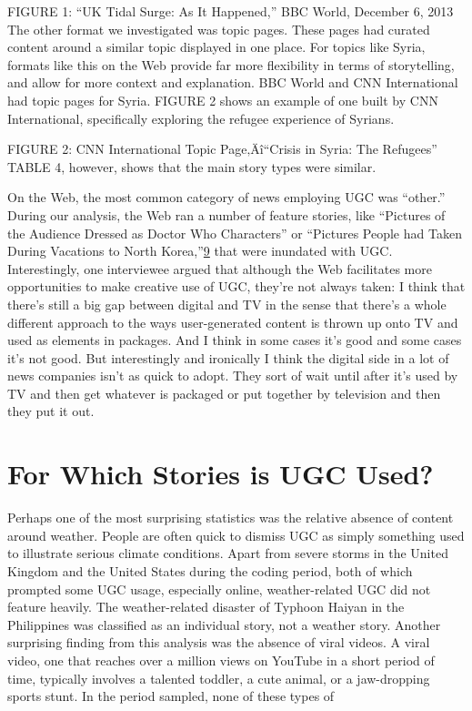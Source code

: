 \documentclass[symmetric, notoc, nobib]{towcenter-book}
\begin{document}
FIGURE 1: ``UK Tidal Surge: As It Happened,'' BBC World, December 6, 2013
The other format we investigated was topic pages. These pages had curated
content around a similar topic displayed in one place. For topics like Syria,
formats like this on the Web provide far more flexibility in terms of storytelling,
and allow for more context and explanation. BBC World and CNN
International had topic pages for Syria. FIGURE 2 shows an example of one
built by CNN International, specifically exploring the refugee experience
of Syrians.

FIGURE 2: CNN International Topic Page‚Äî``Crisis in Syria: The Refugees''
TABLE 4, however, shows that the main story types were similar.


On the Web, the most common category of news employing UGC was
``other.'' During our analysis, the Web ran a number of feature stories, like
``Pictures of the Audience Dressed as Doctor Who Characters'' or ``Pictures
People had Taken During Vacations to North Korea,''{\href{#endnotes}{9}} that were inundated
with UGC.
Interestingly, one interviewee argued that although the Web facilitates
more opportunities to make creative use of UGC, they're not always taken:
I think that there's still a big gap between digital and TV in the sense
that there's a whole different approach to the ways user-generated
content is thrown up onto TV and used as elements in packages.
And I think in some cases it's good and some cases it's not good. But
interestingly and ironically I think the digital side in a lot of news
companies isn't as quick to adopt. They sort of wait until after it's
used by TV and then get whatever is packaged or put together by
television and then they put it out.
\section{For Which Stories is UGC Used?}
Perhaps one of the most surprising statistics was the relative absence of
content around weather. People are often quick to dismiss UGC as simply
something used to illustrate serious climate conditions. Apart from
severe storms in the United Kingdom and the United States during the coding
period, both of which prompted some UGC usage, especially online,
weather-related UGC did not feature heavily. The weather-related disaster
of Typhoon Haiyan in the Philippines was classified as an individual story,
not a weather story.
Another surprising finding from this analysis was the absence of viral videos.
A viral video, one that reaches over a million views on YouTube in a
short period of time, typically involves a talented toddler, a cute animal, or
a jaw-dropping sports stunt. In the period sampled, none of these types of
\end{document}
